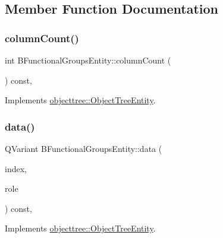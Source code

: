 \subsection{Member Function Documentation}
\mbox{\label{classobjecttree_1_1_b_functional_groups_entity_a4fbae4e27de2f9d5cd521ace87ee5423}} 
\subsubsection{\texorpdfstring{columnCount()}{columnCount()}}
{\footnotesize\ttfamily int B\+Functional\+Groups\+Entity\+::column\+Count (\begin{DoxyParamCaption}{ }\end{DoxyParamCaption}) const\hspace{0.3cm}{\ttfamily [override]}, {\ttfamily [virtual]}}



Implements \mbox{\hyperlink{classobjecttree_1_1_object_tree_entity_a70fd25eccf88b305e9db15fbe3daeae8}{objecttree\+::\+Object\+Tree\+Entity}}.

\mbox{\label{classobjecttree_1_1_b_functional_groups_entity_ae82da4869c7819655bba90eb01da1e3e}} 
\subsubsection{\texorpdfstring{data()}{data()}}
{\footnotesize\ttfamily Q\+Variant B\+Functional\+Groups\+Entity\+::data (\begin{DoxyParamCaption}\item[{const Q\+Model\+Index \&}]{index,  }\item[{int}]{role }\end{DoxyParamCaption}) const\hspace{0.3cm}{\ttfamily [override]}, {\ttfamily [virtual]}}



Implements \mbox{\hyperlink{classobjecttree_1_1_object_tree_entity_a2413c6573de18b451d97eb3800f10f35}{objecttree\+::\+Object\+Tree\+Entity}}.

